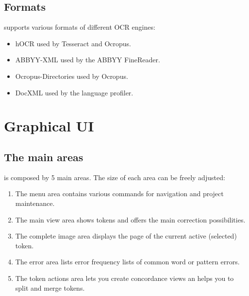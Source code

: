 \subsection{Formats}
\begin{frame}
	\pocoto{} supports various formats of different OCR engines:
	\begin{itemize}
		\item hOCR used by Tesseract and Ocropus.
		\item ABBYY-XML used by the ABBYY FineReader.
		\item Ocropus-Directories used by Ocropus.
		\item DocXML used by the language profiler.
	\end{itemize}
\end{frame}

\section{Graphical UI}
\subsection{The main areas}
\begin{frame}
	\pocoto{} is composed by 5 main areas. The size of each area can be
	freely adjusted:
	\begin{enumerate}
		\item The menu area contains various commands for navigation and project
			maintenance.
		\item The main view area shows tokens and offers the main correction
			possibilities.
		\item The complete image area displays the page of the current active
			(selected) token.
		\item The error area lists error frequency lists of common word or
			pattern errors.
		\item The token actions area lets you create concordance views an helps
			you to split and merge tokens.
	\end{enumerate}
\end{frame}

